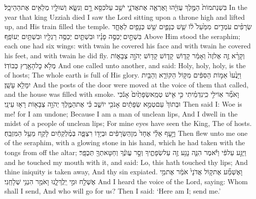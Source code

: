\newperek
{}
\label{haft_17}
\setcounter{chap}{6}
\setcounter{verse}{1}
{בִּשְׁנַת\maqqaf מוֹת֙ הַמֶּ֣לֶךְ עֻזִּיָּ֔הוּ וָאֶרְאֶ֧ה אֶת\maqqaf אֲדֹנָ֛י יֹשֵׁ֥ב עַל\maqqaf כִּסֵּ֖א רָ֣ם וְנִשָּׂ֑א וְשׁוּלָ֖יו מְלֵאִ֥ים אֶת\maqqaf הַהֵיכָֽל׃}
{In the year that king Uzziah died I saw the Lord sitting upon a throne high and lifted up, and His train filled the temple.}
{שְׂרָפִ֨ים עֹמְדִ֤ים \pasek  מִמַּ֙עַל֙ ל֔וֹ שֵׁ֧שׁ כְּנָפַ֛יִם שֵׁ֥שׁ כְּנָפַ֖יִם לְאֶחָ֑ד בִּשְׁתַּ֣יִם \legarmeh  יְכַסֶּ֣ה פָנָ֗יו וּבִשְׁתַּ֛יִם יְכַסֶּ֥ה רַגְלָ֖יו וּבִשְׁתַּ֥יִם יְעוֹפֵֽף׃}
{Above Him stood the seraphim; each one had six wings: with twain he covered his face and with twain he covered his feet, and with twain he did fly.}
{וְקָרָ֨א זֶ֤ה אֶל\maqqaf זֶה֙ וְאָמַ֔ר קָד֧וֹשׁ \pasek  קָד֛וֹשׁ קָד֖וֹשׁ יְהֹוָ֣ה צְבָא֑וֹת מְלֹ֥א כׇל\maqqaf הָאָ֖רֶץ כְּבוֹדֽוֹ׃}
{And one called unto another, and said: Holy, holy, holy, is the \lord\space of hosts; The whole earth is full of His glory.}
{וַיָּנֻ֙עוּ֙ אַמּ֣וֹת הַסִּפִּ֔ים מִקּ֖וֹל הַקּוֹרֵ֑א וְהַבַּ֖יִת יִמָּלֵ֥א עָשָֽׁן׃}
{And the posts of the door were moved at the voice of them that called, and the house was filled with smoke.}
{וָאֹמַ֞ר אֽוֹי\maqqaf לִ֣י כִֽי\maqqaf נִדְמֵ֗יתִי כִּ֣י אִ֤ישׁ טְמֵֽא\maqqaf שְׂפָתַ֙יִם֙ אָנֹ֔כִי וּבְתוֹךְ֙ עַם\maqqaf טְמֵ֣א שְׂפָתַ֔יִם אָנֹכִ֖י יוֹשֵׁ֑ב כִּ֗י אֶת\maqqaf הַמֶּ֛לֶךְ יְהֹוָ֥ה צְבָא֖וֹת רָא֥וּ עֵינָֽי׃}
{Then said I: Woe is me! for I am undone; Because I am a man of unclean lips, And I dwell in the midst of a people of unclean lips; For mine eyes have seen the King, The \lord\space of hosts.}
{וַיָּ֣עׇף אֵלַ֗י אֶחָד֙ מִן\maqqaf הַשְּׂרָפִ֔ים וּבְיָד֖וֹ רִצְפָּ֑ה בְּמֶ֨לְקַחַ֔יִם לָקַ֖ח מֵעַ֥ל הַמִּזְבֵּֽחַ׃}
{Then flew unto me one of the seraphim, with a glowing stone in his hand, which he had taken with the tongs from off the altar;}
{וַיַּגַּ֣ע עַל\maqqaf פִּ֔י וַיֹּ֕אמֶר הִנֵּ֛ה נָגַ֥ע זֶ֖ה עַל\maqqaf שְׂפָתֶ֑יךָ וְסָ֣ר עֲוֺנֶ֔ךָ וְחַטָּאתְךָ֖ תְּכֻפָּֽר׃}
{and he touched my mouth with it, and said: Lo, this hath touched thy lips; And thine iniquity is taken away, And thy sin expiated.}
{וָאֶשְׁמַ֞ע אֶת\maqqaf ק֤וֹל אֲדֹנָי֙ אֹמֵ֔ר אֶת\maqqaf מִ֥י אֶשְׁלַ֖ח וּמִ֣י יֵֽלֶךְ\maqqaf לָ֑נוּ וָאֹמַ֖ר הִנְנִ֥י שְׁלָחֵֽנִי׃}
{And I heard the voice of the Lord, saying: Whom shall I send, And who will go for us? Then I said: ‘Here am I; send me.’}

